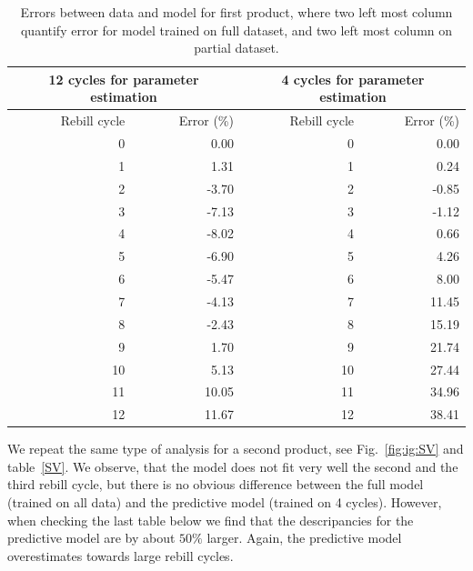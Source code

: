 \documentclass[paper=a4, fontsize=11pt]{scrartcl} %
\numberwithin{equation}{section} %
\numberwithin{figure}{section} %
\numberwithin{table}{section} %
\begin{document}
\begin{table}[ht]
	\centering
	\begin{tabular}{rrrr}
		\hline
		\multicolumn{2}{c|}{12 cycles for parameter estimation} & \multicolumn{2}{c}{4 cycles for parameter estimation} \\
		\hline
	 	Rebill cycle & Error (\%) & Rebill cycle &  Error (\%) \\ 
		\hline
		 0 & 0.00 & 0 & 0.00\\ 
		 1 & 1.31 & 1 & 0.24\\ 
		 2 & -3.70 & 2 & -0.85 \\ 
		 3 & -7.13 & 3 & -1.12 \\ 
		 4 & -8.02 & 4 & 0.66 \\ 
		 5 & -6.90 & 5 & 4.26 \\ 
		 6 & -5.47 & 6 & 8.00 \\ 
		 7 & -4.13 & 7 & 11.45  \\ 
		 8 & -2.43 & 8 & 15.19 \\ 
		 9 & 1.70 & 9 & 21.74  \\ 
		 10 & 5.13 & 10 & 27.44  \\ 
		 11 & 10.05 & 11 & 34.96 \\ 
		 12 & 11.67 & 12 & 38.41 \\ 
		\hline
	\end{tabular}
	\caption{Errors between data and model for first product, where two left most column quantify error for model trained on full dataset, and two left most column on partial dataset.}
	\label{VR}
\end{table}

We repeat the same type of analysis for a second product, see Fig.~\ref{fig:ig:SV} and table~\ref{SV}. We observe, that the model does not fit very well the second and the third rebill cycle, but there is no obvious difference between the full model (trained on all data) and the predictive model (trained on 4 cycles). However, when checking the last table below we find that the descripancies for the predictive model are by about $50\%$ larger. Again, the predictive model overestimates towards large rebill cycles.
\end{document}

